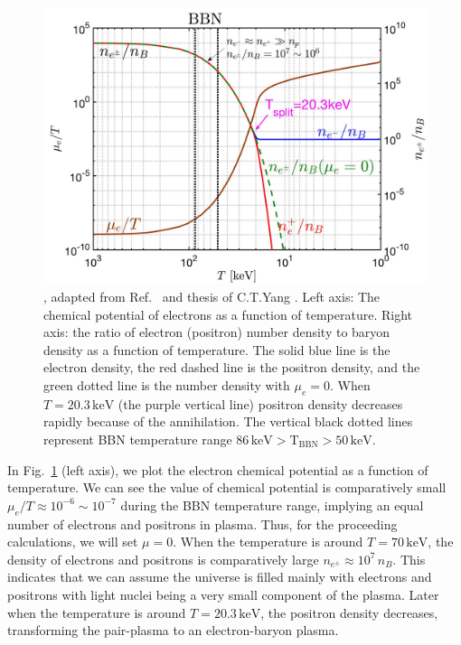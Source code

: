 \begin{figure}[ht]
\begin{center}
\includegraphics[width=0.95\linewidth]{plots/chap03BBN/May152023_EPDensity_Chemical}
\caption{, adapted from Ref.~\cite{Grayson:2023flr} and thesis of C.T.Yang \cite{Yang:2024ret}. Left axis: The chemical potential of electrons as a function of temperature. Right axis: the ratio of electron (positron) number density to baryon density as a function of temperature. The solid blue line is the electron density, the red dashed line is the positron density, and the green dotted line is the number density with $\mu_e=0$. When $T=20.3\,\mathrm{keV}$ (the purple vertical line) positron density decreases rapidly because of the annihilation. The vertical black dotted lines represent BBN temperature range $86\,\mathrm{keV}>\mathrm{T_{BBN}}>50\,\mathrm{keV}$.}
\label{BBN_Electron}
\end{center}
\end{figure}

In Fig.~\ref{BBN_Electron} (left axis), we plot the electron chemical potential as a function of temperature. We can see the value of chemical potential is comparatively small $\mu_e/T\approx10^{-6}\sim10^{-7}$ during the BBN temperature range, implying an equal number of electrons and positrons in plasma. Thus, for the proceeding calculations, we will set $\mu =0$.  When the temperature is around $T=70\,\mathrm{keV}$, the density of electrons and positrons is comparatively large $n_{e^\pm}\approx10^7\,n_B$. This indicates that we can assume the universe is filled mainly with electrons and positrons with light nuclei being a very small component of the plasma. Later when the temperature is around $T=20.3\,\mathrm{keV}$, the positron density decreases, transforming the pair-plasma to an electron-baryon plasma.


